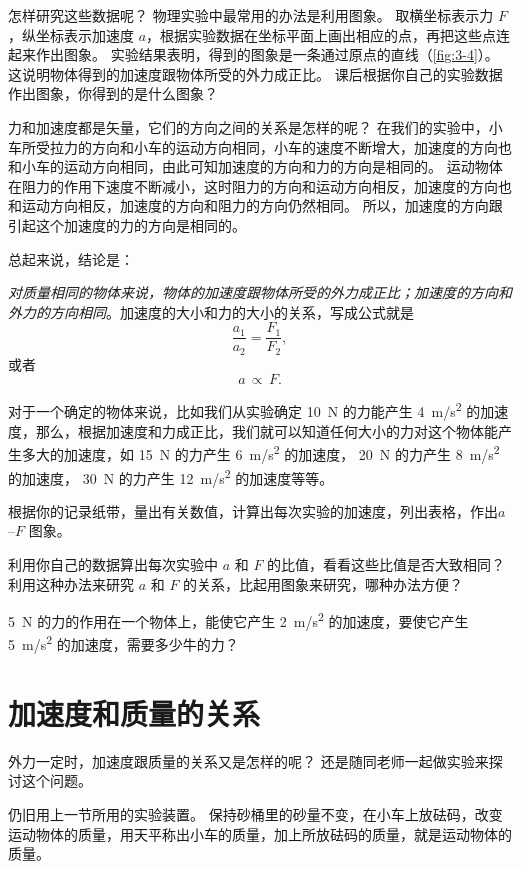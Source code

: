 怎样研究这些数据呢？
物理实验中最常用的办法是利用图象。
取横坐标表示力 $F$，纵坐标表示加速度 $a$，根据实验数据在坐标平面上画出相应的点，再把这些点连起来作出图象。
实验结果表明，得到的图象是一条通过原点的直线（\cref{fig:3-4}）。
这说明物体得到的加速度跟物体所受的外力成正比。
课后根据你自己的实验数据作出图象，你得到的是什么图象？

力和加速度都是矢量，它们的方向之间的关系是怎样的呢？
在我们的实验中，小车所受拉力的方向和小车的运动方向相同，小车的速度不断增大，加速度的方向也和小车的运动方向相同，由此可知加速度的方向和力的方向是相同的。
运动物体在阻力的作用下速度不断减小，这时阻力的方向和运动方向相反，加速度的方向也和运动方向相反，加速度的方向和阻力的方向仍然相同。
所以，加速度的方向跟引起这个加速度的力的方向是相同的。

总起来说，结论是：

\emph{对质量相同的物体来说，物体的加速度跟物体所受的外力成正比；加速度的方向和外力的方向相同}。加速度的大小和力的大小的关系，写成公式就是
\[\frac{a_1}{a_2}=\frac{F_1}{F_2},\]
或者
\[a\,\propto\, F.\]

对于一个确定的物体来说，比如我们从实验确定 \qty{10}{N} 的力能产生 \qty{4}{m/s^2} 的加速度，那么，根据加速度和力成正比，我们就可以知道任何大小的力对这个物体能产生多大的加速度，如 \qty{15}{N} 的力产生 \qty{6}{m/s^2} 的加速度， \qty{20}{N} 的力产生 \qty{8}{m/s^2} 的加速度， \qty{30}{N} 的力产生 \qty{12}{m/s^2} 的加速度等等。

\begin{Practice}
\begin{question}
  \item 根据你的记录纸带，量出有关数值，计算出每次实验的加速度，列出表格，作出$a$--$F$ 图象。
  \item 利用你自己的数据算出每次实验中 $a$ 和 $F$ 的比值，看看这些比值是否大致相同？利用这种办法来研究 $a$ 和 $F$ 的关系，比起用图象来研究，哪种办法方便？
  \item \qty{5}{N} 的力的作用在一个物体上，能使它产生 \qty{2}{m/s^2} 的加速度，要使它产生 \qty{5}{m/s^2} 的加速度，需要多少牛的力？
\end{question}
\end{Practice}


\section{加速度和质量的关系}\label{sec:force_mass}
外力一定时，加速度跟质量的关系又是怎样的呢？
还是随同老师一起做实验来探讨这个问题。

仍旧用上一节所用的实验装置。
保持砂桶里的砂量不变，在小车上放砝码，改变运动物体的质量，用天平称出小车的质量，加上所放砝码的质量，就是运动物体的质量。


